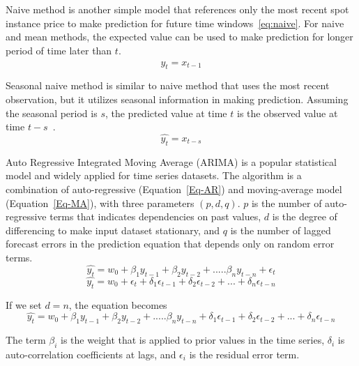 \documentclass[graybox]{svmult}
\begin{document}
Naive method is another simple model that references only the most recent spot instance price to make prediction for future time windows~\ref{eq:naive}. For naive and mean methods, the expected value can be used to make prediction for longer period of time later than $t$. 
\begin{equation}
  \hat{y_{t}} = x_{t-1} 
\label{eq:naive}
\end{equation}

Seasonal naive method is similar to naive method that uses the most recent observation, but it utilizes seasonal information in making prediction. Assuming the seasonal period is $s$, the predicted value at time $t$ is the observed value at time $t-s$~\cite{time-series-analysis}.
\begin{equation}
  \hat{y_{t}} = x_{t-s} 
\label{smean}
\end{equation}

Auto Regressive Integrated Moving Average (ARIMA) is a popular statistical model and widely applied for time series datasets. The algorithm is a combination of auto-regressive (Equation~\ref{Eq-AR}) and moving-average model (Equation~\ref{Eq-MA}), with three parameters  \((p,d,q)\). \(p\) is the number of auto-regressive terms that indicates dependencies on past values, \(d\) is the degree of differencing to make input dataset stationary, and \(q\) is the number of lagged forecast errors in the prediction equation that depends only on random error terms.
\begin{equation}
\hat{y_t} = w_0 +\beta_1 y_{t-1}+ \beta_2 y_{t-2}+.....\beta_n y_{t-n}+\epsilon_t
\label{Eq-AR}
\end{equation}
\begin{equation}
\hat{y_t} = w_0 +\epsilon_t + \delta_1 \epsilon_{t-1}+  \delta_2 \epsilon_{t-2}+...+ \delta_n \epsilon_{t-n}
\label{Eq-MA}
\end{equation}

If we set \(d = n\), the equation becomes 
\begin{equation}
\hat{y_t} = w_0 +\beta_1 y_{t-1}+ \beta_2 y_{t-2}+.....\beta_n y_{t-n} +  \delta_1 \epsilon_{t-1}+  \delta_2 \epsilon_{t-2}+...+ \delta_n \epsilon_{t-n}
\label{Eq-ARIMA}
\end{equation}

The term \(\beta_i \) is the weight that is applied to prior values in the time series, \(\delta_i \) is auto-correlation coefficients at lags, and \(\epsilon_i \) is the residual error term.
\end{document}
